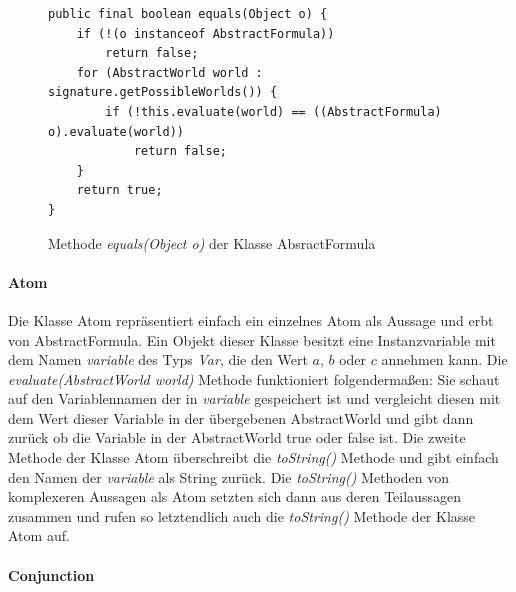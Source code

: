 \documentclass[12pt,a4paper]{article}
\begin{document}
\begin{figure}
\begin{lstlisting}
public final boolean equals(Object o) {
    if (!(o instanceof AbstractFormula))
        return false;
    for (AbstractWorld world : signature.getPossibleWorlds()) {
        if (!this.evaluate(world) == ((AbstractFormula) o).evaluate(world))
            return false;
    }
    return true;
}
\end{lstlisting}
\caption{Methode \textit{equals(Object o)} der Klasse AbsractFormula}
\label{code:equals-formula}
\end{figure} 



\paragraph{Atom} \mbox{}


Die Klasse Atom repräsentiert einfach ein einzelnes Atom als Aussage und erbt von AbstractFormula. Ein Objekt dieser Klasse besitzt eine Instanzvariable mit dem Namen \textit{variable} des Typs \textit{Var}, die den Wert $a$, $b$ oder $c$ annehmen kann. Die \textit{evaluate(AbstractWorld world)} Methode funktioniert folgendermaßen: Sie schaut auf den Variablennamen der in \textit{variable} gespeichert ist und vergleicht diesen mit dem Wert dieser Variable in der übergebenen AbstractWorld und gibt dann zurück ob die Variable in der AbstractWorld true oder false ist. Die zweite Methode der Klasse Atom überschreibt die \textit{toString()} Methode und gibt einfach den Namen der \textit{variable} als String zurück. Die \textit{toString()} Methoden von komplexeren Aussagen als Atom setzten sich dann aus deren Teilaussagen zusammen und rufen so letztendlich auch die \textit{toString()} Methode der Klasse Atom auf.


\paragraph{Conjunction} \mbox{}
\end{document}
